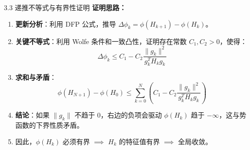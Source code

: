\documentclass[11pt,hyperref={pdfpagelabels=false}]{beamer}
\begin{document}
\begin{frame}{3.3 递推不等式与有界性证明}
    \textbf{证明思路：}
    \begin{enumerate}
        \item \textbf{更新分析}：利用 DFP 公式，推导 $\Delta \phi_k = \phi(H_{k+1}) - \phi(H_k)$。
        \item \textbf{关键不等式}：利用 Wolfe 条件和一致凸性，证明存在常数 $C_1, C_2 > 0$，使得：
            \begin{equation*}
                \Delta \phi_k \le C_1 - C_2 \frac{\|g_k\|^2}{g_k^T H_k g_k}
            \end{equation*}
        \item \textbf{求和与矛盾}：
            \begin{equation*}
                \phi(H_{N+1}) - \phi(H_0) \le \sum_{k=0}^N (C_1 - C_2 \frac{\|g_k\|^2}{g_k^T H_k g_k})
            \end{equation*}
        \item \textbf{结论}：如果 $\|g_k\|$ 不趋于 0，右边的负项会驱动 $\phi(H_k)$ 趋于 $-\infty$，这与势函数的下界性质矛盾。
        \item 因此，$\phi(H_k)$ 必须有界 $\implies$ $H_k$ 的特征值有界 $\implies$ 全局收敛。
    \end{enumerate}
\end{frame}
\end{document}
